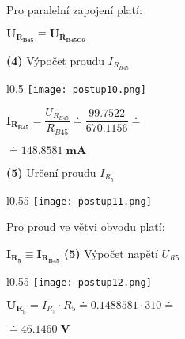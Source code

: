 \documentclass[a4paper,12pt]{article}
\begin{document}
\vspace{55pt}
\hspace{1em}Pro paralelní zapojení platí:\par\hspace{1em}$\mathbf{U_{R_{B45}}\equiv U_{R_{B45C6}}}$\par\vspace{3.4em}
\hspace{1em}\textbf{(4)} Výpočet proudu $I_{R_{B45}}$\par
\begin{wrapfigure}{l}{0.5\textwidth}
\vspace{-55pt}
\texttt{[image: postup10.png]}
\vspace{-55pt}
\end{wrapfigure}
\vspace{40pt}
\hspace{1em}$\mathbf{I_{R_{B45}}}=\dfrac {U_{R_{B45}}}{R_{B45}}\doteq \dfrac{99.7522}{670.1156}\doteq $\par\hspace{1em}$\doteq \mathbf{ 148.8581 \;\si{\milli\ampere}}$\par\vspace{3.7em}
\hspace{1em}\textbf{(5)} Určení proudu $I_{R_{5}}$\par
\begin{wrapfigure}{l}{0.55\textwidth}
\vspace{-77pt}
\texttt{[image: postup11.png]}
\vspace{-60pt}
\end{wrapfigure}
\vspace{65pt}
\hspace{1em}Pro proud ve větvi obvodu platí:\par\hspace{1em}$\mathbf{I_{R_{5}}\equiv I_{R_{B45}}}$\newpage
\hspace{1em}\textbf{(5)} Výpočet napětí $U_{R5}$\par
\begin{wrapfigure}{l}{0.55\textwidth}
\vspace{-67pt}
\texttt{[image: postup12.png]}
\vspace{-65pt}
\end{wrapfigure}
\vspace{55pt}
$\mathbf{U_{R_5}}=I_{R_{5}}\cdot R_{5}\doteq 0.1488581\cdot 310\doteq$\par$\doteq \mathbf{ 46.1460 \;\si{\volt}}$\par\vspace{3.8em}
\end{document}
